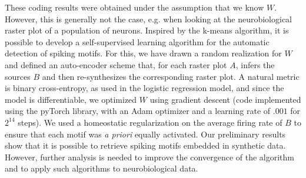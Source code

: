 \documentclass[11pt]{article}
\begin{document}
These coding results were obtained under the assumption that we know $W$. However, this is generally not the case, e.g. when looking at the neurobiological raster plot of a population of neurons. Inspired by the k-means algorithm, it is possible to develop a self-supervised learning algorithm for the automatic detection of spiking motifs. For this, we have drawn a random realization for $W$ and defined an auto-encoder scheme that, for each raster plot $A$, infers the sources $B$ and then re-synthesizes the corresponding raster plot. A natural metric is binary cross-entropy, as used in the logistic regression model, and since the model is differentiable, we optimized $W$ using gradient descent (code implemented using the pyTorch library, with an Adam optimizer and a learning rate of $.001$ for $2^{14}$ steps). We used a homeostatic regularization on the average firing rate of $B$ to ensure that each motif was \emph{a priori} equally activated. Our preliminary results show that it is possible to retrieve spiking motifs embedded in synthetic data. However, further analysis is needed to improve the convergence of the algorithm and to apply such algorithms to neurobiological data. %
%
\printbibliography
\end{document}

